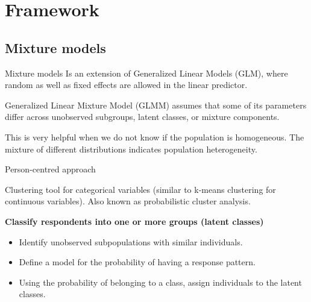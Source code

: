 \documentclass[11pt,t]{beamer}
\begin{document}
\section{Framework}
\subsection{Mixture models}
\begin{frame}[c,plain]{Mixture models}
\vspace{-11pt}
Is an extension of Generalized Linear Models (GLM), where random as well as fixed effects are allowed in the linear predictor.
\vspace{11pt}

Generalized Linear Mixture Model (GLMM) assumes that some of its parameters differ across unobserved subgroups, latent classes, or mixture components.  
\vspace{11pt}

This is very helpful when we do not know if the population is homogeneous. The mixture of different distributions indicates population heterogeneity.   

\end{frame}


\begin{frame}[c,plain]{Person-centred approach }
\vspace{-11pt}

Clustering tool for categorical variables (similar to k-means clustering for continuous variables).  
Also known as probabilistic cluster analysis.  
\vspace{11pt}

\textbf{Classify respondents into one or more groups (latent classes)}
\vspace{11pt}

\begin{itemize}
\item Identify unobserved subpopulations with similar individuals. 
\item Define a model for the probability of having a response pattern.  
\item Using the probability of belonging to a class, assign individuals to the latent classes. 
\end{itemize}
\end{frame}
\end{document}
